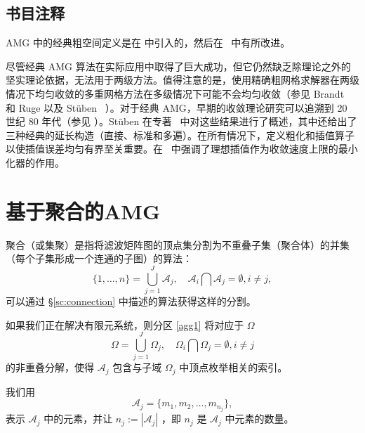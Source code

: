 \documentclass[12pt]{acta_2011xz}
\begin{document}
   \subsection{书目注释  }    AMG 中的经典粗空间定义是在
   \cite{1stAMG}    中引入的，然后在~    \cite{Stuben.K.1983a,Brandt.A;McCormick.S;Ruge.J.1985a,Ruge.J;Stuben.K.1987a}    中有所改进。  

尽管经典 AMG 算法在实际应用中取得了巨大成功，但它仍然缺乏除理论之外的坚实理论依据，无法用于两级方法。值得注意的是，使用精确粗网格求解器在两级情况下均匀收敛的多重网格方法在多级情况下可能不会均匀收敛（参见 Brandt~    \cite{Brandt.A.1986a}    和 Ruge 以及 St\"{u}ben~    \cite{Ruge.J;Stuben.K.1987a}    ）。对于经典 AMG，早期的收敛理论研究可以追溯到 20 世纪 80 年代（参见
   \cite{Mandel.J.1988a,McCormick.S.1982a,Brandt.A.1986a,Ruge.J;Stuben.K.1987a}    ）。St\"{u}ben 在专著~    \cite{Trottenberg.U;Oosterlee.C;Schuller.A.2001a}    中对这些结果进行了概述，其中还给出了三种经典的延长构造（直接、标准和多遍）。在所有情况下，定义粗化和插值算子以使插值误差均匀有界至关重要。在~   \cite{Falgout.R;Vassilevski.P.2004a}    中强调了理想插值作为收敛速度上限的最小化器的作用。  

   \section{基于聚合的AMG  }       \label{s:agmg}    聚合（或集聚）是指将滤波矩阵图的顶点集分割为不重叠子集（聚合体）的并集（每个子集形成一个连通的子图）的算法： 
   \begin{equation}
\label{agg1}
 \{ 1, \dots, n \} =\bigcup_{j=1}^{J}\mathcal A_j, \quad \mathcal
A_i\bigcap \mathcal A_j=\emptyset, i\neq j,
\end{equation}    可以通过    \S       \ref{sc:connection}    中描述的算法获得这样的分割。  

如果我们正在解决有限元系统，则分区    \eqref{agg1}    将对应于    $\Omega$    
   \begin{equation}\label{UA_Omega}
 \Omega=\bigcup_{j=1}^J\Omega_j, 
\quad \Omega_i\bigcap \Omega_j=\emptyset, i\neq j
\end{equation}    的非重叠分解，使得    $\mathcal A_j$    包含与子域    $\Omega_j$    中顶点枚举相关的索引。  

我们用 
   \begin{equation}
    \mathcal A_j= \{ m_1, m_2, \dots, m_{n_j} \} ,
\end{equation}    表示    $\mathcal A_j$    中的元素，并让    $n_j:=|\mathcal A_j|$    ，即    $n_j$    是    $\mathcal A_j$    中元素的数量。  
\end{document}

